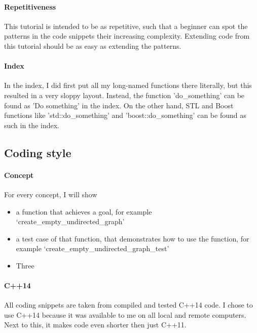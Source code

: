 \paragraph{Repetitiveness}

This tutorial is intended to be as repetitive, such that a beginner can
 spot the patterns in the code snippets their increasing complexity.
 Extending code from this tutorial should be as easy as extending the patterns.

\paragraph{Index}

In the index, I did first put all my long-named functions there literally,
but this resulted in a very sloppy layout.
Instead, the function 'do_something' can be found as 'Do something' in
the index.
On the other hand, STL and Boost functions like 'std::do_something' and
'boost::do_something' can be found as such in the index.

\subsection{Coding style}

\paragraph{Concept}

For every concept, I will show

\begin{itemize}
    \item a function that achieves a goal, for example `create_empty_undirected_graph'
    \item{
      a test case of that function, 
      that demonstrates how to use the function, for example
      `create_empty_undirected_graph_test'
    }
    \item Three
\end{itemize}

\paragraph{C++14}

All coding snippets are taken from compiled and tested C++14 code.
I chose to use C++14 because it was available to me on all local and remote
computers.
Next to this, it makes code even shorter then just C++11.

